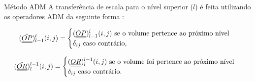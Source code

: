 \documentclass[professionalfont]{beamer}
\begin{document}
    


\begin{frame}{Método ADM}
    \small
    A transferência de escala para o nível superior ($l$) é feita utilizando os operadores ADM da seguinte forma \cite{Cusini2016}:

    \begin{equation}
        \label{eq:multinivel.1}
    (\hat{\underline{\underline{OP}}})^{l}_{l-1} (i,j) =
        \begin{cases}
            (\underline{\underline{OP}})^{l}_{l-1} (i,j) \text{ se o volume pertence ao próximo nível}\\
            \delta_{ij} \text{ caso contrário},\\
        \end{cases}
    \end{equation}

    \begin{equation}
        \label{eq:multinivel.2}
    (\hat{\underline{\underline{OR}}})^{l-1}_{l} (i,j) =
        \begin{cases}
            (\underline{\underline{OR}})^{l-1}_{l} (i,j) \text{ se o volume foi pertence ao próximo nível}\\
            \delta_{ij} \text{ caso contrário}.\\
        \end{cases}
    \end{equation}

\end{frame}

\end{document}

